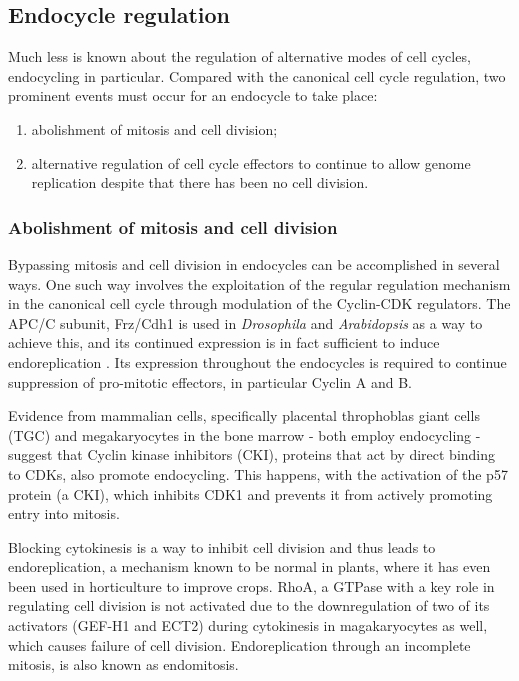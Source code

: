 \documentclass[11pt,twoside,a4paper]{report}
\begin{document}
			\subsection{Endocycle regulation}
			\label{subsection:endocycles}
			Much less is known about the regulation of alternative modes of cell cycles, endocycling in particular. Compared with the canonical cell cycle regulation, two prominent events must occur for an endocycle to take place:
			
			\begin{enumerate}
				\item abolishment of mitosis and cell division;
				\item alternative regulation of cell cycle effectors to continue to allow genome replication despite that there has been no cell division.
			\end{enumerate}
						
				\subsubsection{Abolishment of mitosis and cell division}
				Bypassing mitosis and cell division in endocycles can be accomplished in several ways. One such way involves the exploitation of the regular regulation mechanism in the canonical cell cycle through modulation of the Cyclin-CDK regulators. 
				The APC/C subunit, Frz/Cdh1 is used in \textit{Drosophila} and \textit{Arabidopsis} as a way to achieve this, and its continued expression is in fact sufficient to induce endoreplication \cite{asd}. Its expression throughout the endocycles is required to continue suppression of pro-mitotic effectors, in particular Cyclin A and B.
				
				Evidence from mammalian cells, specifically placental throphoblas giant cells (TGC) and megakaryocytes in the bone marrow - both employ endocycling - suggest that Cyclin kinase inhibitors (CKI), proteins that act by direct binding to CDKs, also promote endocycling. This happens, with the activation of the p57 protein (a CKI), which inhibits CDK1 and prevents it from actively promoting entry into mitosis.	
				
			 	Blocking cytokinesis is a way to inhibit cell division and thus leads to endoreplication, a mechanism known to be normal in plants, where it has even been used in horticulture to improve crops. RhoA, a GTPase with a key role in regulating cell division is not activated due to the downregulation of two of its activators (GEF-H1 and ECT2) during cytokinesis in magakaryocytes as well, which causes failure of cell division. Endoreplication through an incomplete mitosis, is also known as endomitosis.
			
\end{document}
